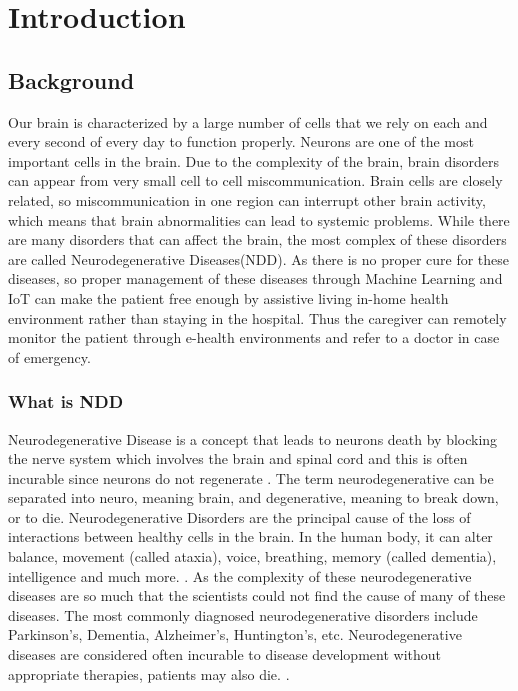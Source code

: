 \chapter{Introduction}

\section{Background}
Our brain is characterized by a large number of cells that we rely on each and every second of every day to function properly. Neurons are one of the most important cells in the brain. Due to the complexity of the brain, brain
disorders can appear from very small cell to cell miscommunication. Brain cells are closely related, so miscommunication in one region can interrupt
other brain activity, which means that brain abnormalities can lead to systemic problems.
While there are many disorders that can affect the
brain, the most complex of these disorders are called Neurodegenerative Diseases(NDD).%
 As there is no proper cure for these diseases, so proper management of these diseases through Machine Learning and IoT can make the patient free enough by assistive living in-home health environment rather than staying in the hospital. Thus the caregiver can remotely monitor the patient through e-health environments and refer to a doctor in case of emergency.


\subsection{What is NDD}
Neurodegenerative Disease is a concept that leads to neurons death by blocking the nerve system which involves the brain and spinal cord and this is often incurable since neurons do not regenerate \cite{noor_detecting_2019}. The term neurodegenerative can be separated into neuro, meaning brain, and degenerative, meaning to break down, or to die. Neurodegenerative Disorders are the principal cause of the loss of interactions between healthy cells in the brain. In the human body, it can alter balance, movement (called ataxia), voice, breathing, memory (called dementia), intelligence and much more. \cite{bak_what_2012}. As the complexity of these neurodegenerative diseases are so much that the scientists could not find the cause of many of these diseases. The most commonly diagnosed neurodegenerative disorders include Parkinson's, Dementia, Alzheimer's, Huntington's, etc. Neurodegenerative diseases are considered often incurable to disease development without appropriate therapies, patients may also die. \cite{finkbeiner_huntingtons_2011}.







